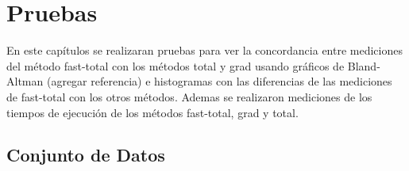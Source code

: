 
\chapter{Pruebas}\label{ch:testing}    

En este capítulos se realizaran pruebas para ver la concordancia entre mediciones del método fast-total con los métodos total y grad usando gráficos de Bland-Altman (agregar referencia) e histogramas con las diferencias de las mediciones de fast-total con los otros métodos. Ademas se realizaron mediciones de los tiempos de ejecución de los métodos fast-total, grad y total.

\section{Conjunto de Datos}


